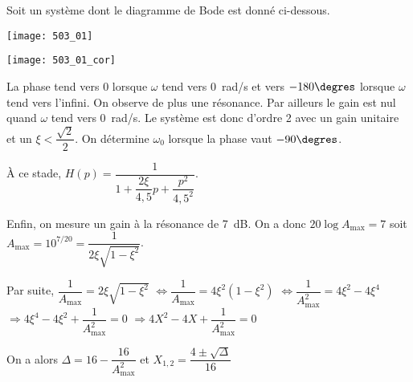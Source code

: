 \normaltrue \difficilefalse \tdifficilefalse
\correctiontrue



\newpage
{}
\setcounter{question}{0}%

\ifcorrection
\else
{}
\fi


\ifprof 
\else


Soit un système dont le diagramme de Bode est donné ci-dessous.
\begin{marginfigure}
\texttt{[image: 503\_01]}
\end{marginfigure}
\fi

\ifprof
\begin{marginfigure}
\texttt{[image: 503\_01\_cor]}
\end{marginfigure}
\else
\fi


\ifprof
La phase tend vers 0 lorsque $\omega$ tend vers \SI{0}{rad/s} et vers $-180\degres$ lorsque $\omega$ tend vers l'infini. 
On observe de plus une résonance. Par ailleurs le gain est nul quand $\omega$ tend vers \SI{0}{rad/s}. 
Le système est donc d'ordre 2 avec un gain unitaire et un $\xi<\dfrac{\sqrt{2}}{2}$. 
On détermine $\omega_0$ lorsque la phase vaut $-90\degres$.

À ce stade, $H(p)=\dfrac{1}{1+\dfrac{2\xi}{4,5}p+\dfrac{p^2}{4,5^2}}$.

Enfin, on mesure un gain à la résonance de \SI{7}{dB}. 
On a donc $20\log A_{\text{max}}=7$ soit $A_{\text{max}}=10^{7/20}= \dfrac{1}{2\xi\sqrt{1-\xi^2}}$.

Par suite, 
 $\dfrac{1}{A_{\text{max}}}=2\xi\sqrt{1-\xi^2}$
 $\Leftrightarrow \dfrac{1}{A_{\text{max}}}=4\xi^2\left(1-\xi^2\right)$
 $\Leftrightarrow \dfrac{1}{A^2_{\text{max}}}=4\xi^2-4\xi^4$
  $\Rightarrow 4\xi^4 -4\xi^2+ \dfrac{1}{A^2_{\text{max}}}=0$ 
  $\Rightarrow 4X^2 -4X+ \dfrac{1}{A^2_{\text{max}}}=0$
  
 On a alors $\Delta = 16 -  \dfrac{16}{A^2_{\text{max}}}$ et $X_{1,2} = \dfrac{4\pm\sqrt{\Delta}}{16}$
 
